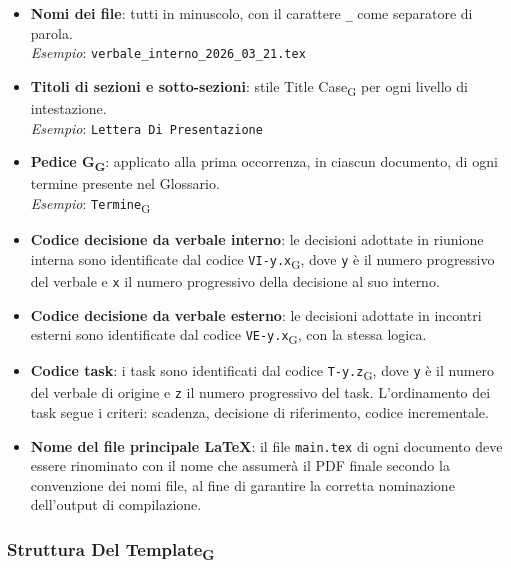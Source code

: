 \begin{itemize}
  \item \textbf{Nomi dei file}: tutti in minuscolo, con il carattere \texttt{\_}
        come separatore di parola. \\
        \textit{Esempio}: \texttt{verbale\_interno\_2026\_03\_21.tex}
 
  \item \textbf{Titoli di sezioni e sotto-sezioni}: stile Title Case\textsubscript{G}
        per ogni livello di intestazione. \\
        \textit{Esempio}: \texttt{Lettera Di Presentazione}
 
  \item \textbf{Pedice G\textsubscript{G}}: applicato alla prima occorrenza, in
        ciascun documento, di ogni termine presente nel Glossario. \\
        \textit{Esempio}: \texttt{Termine}\textsubscript{G}
 
  \item \textbf{Codice decisione da verbale interno}: le decisioni adottate in
        riunione interna sono identificate dal codice \texttt{VI-y.x}\textsubscript{G}, dove
        \texttt{y} è il numero progressivo del verbale e \texttt{x} il numero
        progressivo della decisione al suo interno.
 
  \item \textbf{Codice decisione da verbale esterno}: le decisioni adottate in
        incontri esterni sono identificate dal codice \texttt{VE-y.x}\textsubscript{G},
        con la stessa logica.
 
  \item \textbf{Codice task}: i task sono identificati dal codice \texttt{T-y.z}\textsubscript{G},
        dove \texttt{y} è il numero del verbale di origine e \texttt{z} il numero
        progressivo del task. L'ordinamento dei task segue i criteri: scadenza,
        decisione di riferimento, codice incrementale.
 
  \item \textbf{Nome del file principale \LaTeX{}}: il file \texttt{main.tex} di
        ogni documento deve essere rinominato con il nome che assumerà il PDF
        finale secondo la convenzione dei nomi file, al fine di garantire la
        corretta nominazione dell'output di compilazione.
\end{itemize}
 
\subsubsection{Struttura Del Template\textsubscript{G}}
 
